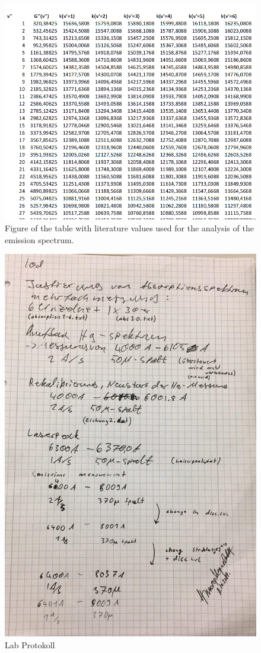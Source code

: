 \begin{figure}[ht]
	\includegraphics[scale=0.8]{Bild/DATA.png}
	\centering
	\caption[Table with Literature Values]{Figure of the table with literature values used for the analysis of the emission spectrum.\cite{Anleitung}}
	\label{TableSTAATSEXAMEN}
\end{figure}
\begin{figure}[ht]
	\includegraphics[scale=0.5]{Bild/Lab.jpg}
	\centering
	\caption{Lab Protokoll}
\end{figure}
